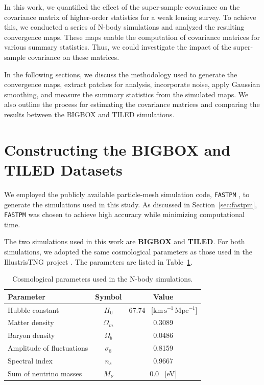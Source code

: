
In this work, we quantified the effect of the super-sample covariance on the covariance matrix of higher-order statistics for a weak lensing survey. To achieve this, we conducted a series of N-body simulations and analyzed the resulting convergence maps. These maps enable the computation of covariance matrices for various summary statistics. Thus, we could investigate the impact of the super-sample covariance on these matrices.

In the following sections, we discuss the methodology used to generate the convergence maps, extract patches for analysis, incorporate noise, apply Gaussian smoothing, and measure the summary statistics from the simulated maps. We also outline the process for estimating the covariance matrices and comparing the results between the BIGBOX and TILED simulations.

\section{Constructing the BIGBOX and TILED Datasets}
We employed the publicly available particle-mesh simulation code, \texttt{FASTPM} \citep{10.1093/mnras/stw2123}, to generate the simulations used in this study. As discussed in Section~\ref{sec:fastpm}, \texttt{FASTPM} was chosen to achieve high accuracy while minimizing computational time.

The two simulations used in this work are \textbf{BIGBOX} and \textbf{TILED}. For both simulations, we adopted the same cosmological parameters as those used in the IllustrisTNG project \citep{2019ComAC...6....2N}. The parameters are listed in Table~\ref{tab:simulations}.

\begin{table}[h]
    \centering
    \begin{tabular}{lcc}
    \toprule
    \textbf{Parameter} & \textbf{Symbol} & \textbf{Value} \\
    \midrule
    Hubble constant & $H_0$ & 67.74 \, [$\mathrm{km\,s^{-1}\,Mpc^{-1}}$] \\ 
    Matter density & $\Omega_m$ & 0.3089 \\
    Baryon density & $\Omega_b$ & 0.0486 \\
    Amplitude of fluctuations & $\sigma_8$ & 0.8159 \\
    Spectral index & $n_s$ & 0.9667 \\
    Sum of neutrino masses & $M_{\nu}$ & 0.0 \, [eV] \\
    \bottomrule
    \end{tabular}
    \caption{Cosmological parameters used in the N-body simulations.}\label{tab:simulations}
\end{table}

